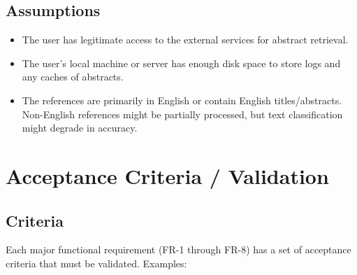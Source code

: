\documentclass[12pt]{article}
\begin{document}
\subsection{Assumptions}
\begin{itemize}
  \item The user has legitimate access to the external services for abstract retrieval.
  \item The user’s local machine or server has enough disk space to store logs and any caches of abstracts.
  \item The references are primarily in English or contain English titles/abstracts. Non-English references might be partially processed, but text classification might degrade in accuracy.
\end{itemize}

\newpage

\section{Acceptance Criteria / Validation}

\subsection{Criteria}
Each major functional requirement (FR-1 through FR-8) has a set of acceptance criteria that must be validated. Examples:
\end{document}
